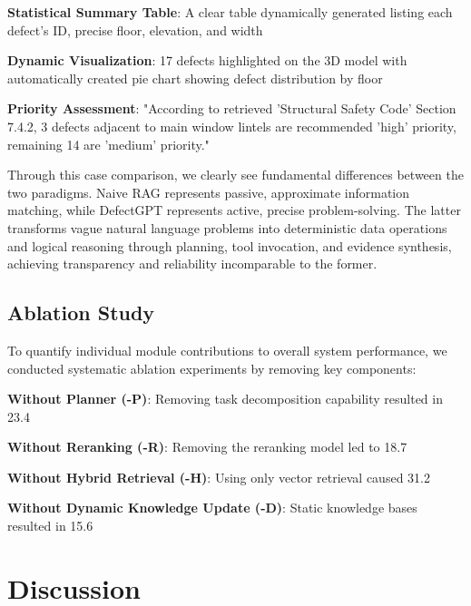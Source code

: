 \textbf{Statistical Summary Table}: A clear table dynamically generated listing each defect's ID, precise floor, elevation, and width

\textbf{Dynamic Visualization}: 17 defects highlighted on the 3D model with automatically created pie chart showing defect distribution by floor

\textbf{Priority Assessment}: "According to retrieved 'Structural Safety Code' Section 7.4.2, 3 defects adjacent to main window lintels are recommended 'high' priority, remaining 14 are 'medium' priority."

Through this case comparison, we clearly see fundamental differences between the two paradigms. Naive RAG represents passive, approximate information matching, while DefectGPT represents active, precise problem-solving. The latter transforms vague natural language problems into deterministic data operations and logical reasoning through planning, tool invocation, and evidence synthesis, achieving transparency and reliability incomparable to the former.

\subsection{Ablation Study}

To quantify individual module contributions to overall system performance, we conducted systematic ablation experiments by removing key components:

\textbf{Without Planner (-P)}: Removing task decomposition capability resulted in 23.4%

\textbf{Without Reranking (-R)}: Removing the reranking model led to 18.7%

\textbf{Without Hybrid Retrieval (-H)}: Using only vector retrieval caused 31.2%

\textbf{Without Dynamic Knowledge Update (-D)}: Static knowledge bases resulted in 15.6%

\section{Discussion}

